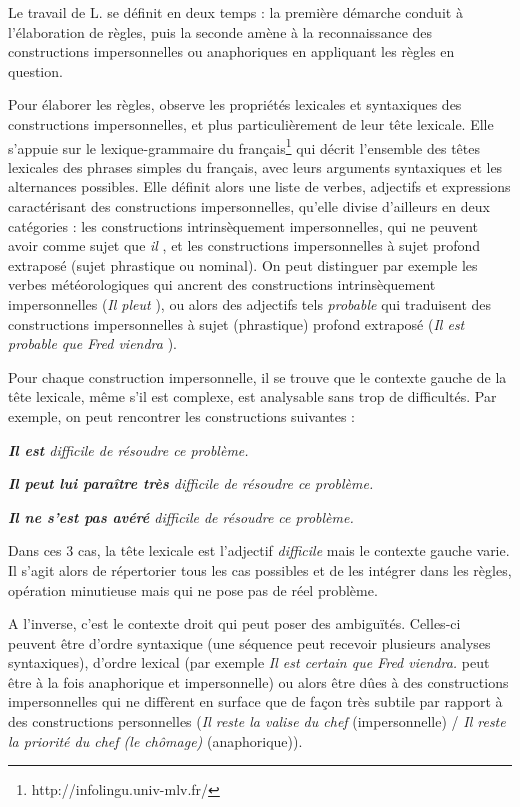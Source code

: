 \documentclass[a4paper,12pt]{article}
\begin{document}
Le travail de L. \citeauthor{danlos-ilimp-taln2005} se définit en deux temps : la première démarche conduit à l'élaboration de règles, puis la seconde amène à la reconnaissance des constructions impersonnelles ou anaphoriques en appliquant les règles en question.

Pour élaborer les règles, \citeauthor{danlos-ilimp-taln2005} observe les propriétés lexicales et syntaxiques des constructions impersonnelles, et plus particulièrement de leur tête lexicale. Elle s'appuie sur le lexique-grammaire du français\footnote{http://infolingu.univ-mlv.fr/} \citep{gross-halshs-00278309,leclere-hal-00192888}
 qui décrit l'ensemble des têtes lexicales des phrases simples du français, avec leurs arguments syntaxiques et les alternances possibles.
Elle définit alors une liste de verbes, adjectifs et expressions caractérisant des constructions impersonnelles, qu'elle divise d'ailleurs en deux catégories : les constructions intrinsèquement impersonnelles, qui ne peuvent avoir comme sujet que \og \textit{il} \fg{}, et les constructions impersonnelles à sujet profond extraposé (sujet phrastique ou nominal). On peut distinguer par exemple les verbes météorologiques qui ancrent des constructions intrinsèquement impersonnelles (\og \textit{Il pleut} \fg{}), ou alors des adjectifs tels \og \textit{probable} \fg{} qui traduisent des constructions impersonnelles à sujet (phrastique) profond extraposé (\og \textit{Il est probable que Fred viendra} \fg{}).

Pour chaque construction impersonnelle, il se trouve que le contexte gauche de la tête lexicale, même s'il est complexe, est analysable sans trop de difficultés.
Par exemple, on peut rencontrer les constructions suivantes :

\og{}\textit{\textbf{Il est} difficile de résoudre ce problème.}\fg{}

\og{}\textit{\textbf{Il peut lui paraître très} difficile de résoudre ce problème.}\fg{}

\og{}\textit{\textbf{Il ne s'est pas avéré} difficile de résoudre ce problème.}\fg{}

Dans ces 3 cas, la tête lexicale est l'adjectif \og \textit{difficile} \fg{} mais le contexte gauche varie. Il s'agit alors de répertorier tous les cas possibles et de les intégrer dans les règles, opération minutieuse mais qui ne pose pas de réel problème.

A l'inverse, c'est le contexte droit qui peut poser des ambiguïtés. Celles-ci peuvent être d'ordre syntaxique (une séquence peut recevoir plusieurs analyses syntaxiques), d'ordre lexical (par exemple \og{}\textit{Il est certain que Fred viendra.}\fg{} peut être à la fois anaphorique et impersonnelle) ou alors être dûes à des constructions impersonnelles qui ne diffèrent en surface que de façon très subtile par rapport à des constructions personnelles (\og{}\textit{Il reste la valise du chef}\fg{} (impersonnelle) / \og{}\textit{Il reste la priorité du chef (le chômage)}\fg{} (anaphorique)).
\end{document}
